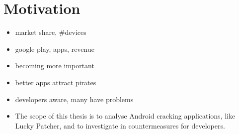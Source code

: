 \section{Motivation} \label{subsection:introduction-motivation}
\begin{itemize}
    \item market share, \#devices
    \item google play, apps, revenue
    \item \+  becoming more important
    \item \- better apps attract pirates
    \item developers aware, many have problems
    \item The scope of this thesis is to analyse Android cracking applications, like Lucky Patcher, and to investigate in countermeasures for developers.
\end{itemize}
